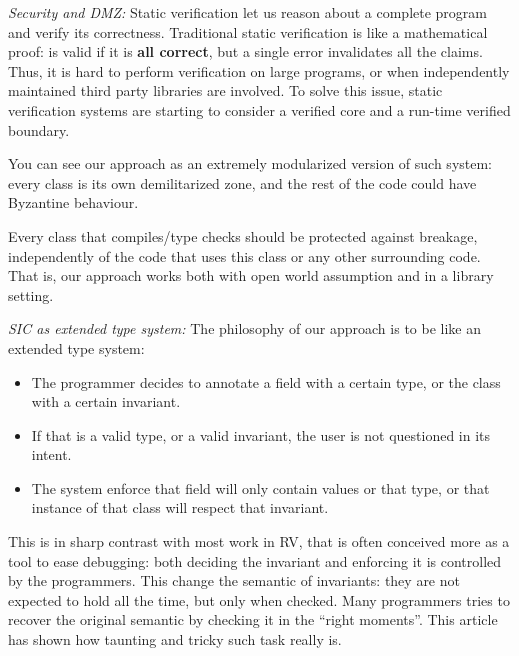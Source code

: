 \noindent\textit{Security and DMZ:}
Static verification let us reason about a complete program
and verify its correctness.
Traditional static verification is like a mathematical proof: is valid if it is \textbf{all correct},
but a single error invalidates all the claims.
Thus, it is hard to perform verification on large programs, or when independently maintained third party libraries
are involved.
To solve this issue, static verification systems are starting to consider a verified core
and a run-time verified boundary.

You can see our approach as an extremely modularized version of such system:
every class is its own demilitarized zone, and the rest of the code 
could have Byzantine behaviour.

Every class that compiles/type checks should be protected against breakage,
 independently of the code that uses this class or any other surrounding code.
 That is, our approach works both with open world assumption and in a library setting.

\noindent\textit{SIC as extended type system:}
The philosophy of our approach is to be like an extended type system: 
\begin{itemize}
\item The programmer decides to annotate a field with a certain type, or the class with a certain invariant.
\item If that is a valid type, or a valid invariant, the user is not questioned in its intent.
\item The system enforce that field will only contain values or that type, or that instance of that class
will respect that invariant.
\end{itemize}
This is in sharp contrast with most work in RV, that is often conceived more as a tool to ease debugging:
both deciding the invariant and enforcing it is controlled by the programmers.
This change the semantic of invariants: they are not expected to hold all the time,
but only when checked. Many programmers tries to recover the original semantic
by checking it in the ``right moments''. This article has shown how taunting and tricky such task really is.
